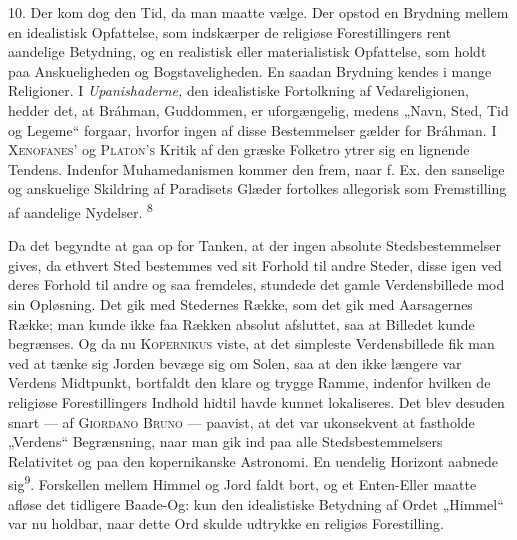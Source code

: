 \documentclass[12pt,a4paper,openany]{book}
\newcommand{\opage}[1]{\marginnote{\footnotesize\textit{[#1]}}}
\begin{document}
10. Der kom dog den Tid, da man maatte vælge. Der opstod en Brydning
mellem en idealistisk Opfattelse, som indskærper de religiøse
Forestillingers rent aandelige Betydning, og en realistisk eller
materialistisk Opfattelse, som holdt paa Anskueligheden og
Bogstaveligheden. En saadan Brydning kendes i mange Religioner. I
\textit{Upanishaderne,} den idealistiske Fortolkning af Vedareligionen,
hedder det, at Bráhman, Guddommen, er uforgængelig, medens „Navn, Sted,
Tid og Legeme“ forgaar, hvorfor ingen af disse Bestemmelser gælder for
Bráhman. I \textsc{Xenofanes’} og \textsc{Platon’s} Kritik af den græske
Folketro ytrer sig en lignende Tendens. Indenfor Muhamedanismen kommer
den frem, naar f. Ex. den sanselige og anskuelige Skildring af
Paradisets Glæder fortolkes allegorisk som Fremstilling af aandelige
Nydelser. \textsuperscript{8}

Da det begyndte at gaa op for Tanken, at der ingen absolute
Stedsbestemmelser gives, da ethvert Sted bestemmes ved sit Forhold til
andre Steder, disse igen ved deres Forhold til andre og saa fremdeles,
stundede det gamle Verdensbillede mod sin Opløsning. Det gik med
Stedernes Række, som det gik med Aarsagernes Række; man kunde ikke faa
Rækken absolut afsluttet, saa at Billedet kunde begrænses. Og da nu
\textsc{Kopernikus} viste, at det simpleste Verdensbillede fik man ved
at tænke sig Jorden bevæge sig om Solen, saa at den ikke længere var
Verdens Midtpunkt, bortfaldt den klare og trygge Ramme, indenfor hvilken
de religiøse Forestillingers Indhold hidtil havde kunnet lokaliseres.
Det blev desuden snart --- af \textsc{Giordano Bruno} --- paavist, at
det var ukonsekvent at fastholde „Verdens“ Begrænsning, naar man gik ind
paa alle Stedsbestemmelsers Relativitet og paa den kopernikanske
Astronomi. En uendelig Horizont aabnede sig\textsuperscript{9}.
Forskellen mellem
\opage{29}Himmel og Jord faldt bort, og et Enten-Eller maatte afløse det
tidligere Baade-Og: kun den idealistiske Betydning af Ordet „Himmel“ var
nu holdbar, naar dette Ord skulde udtrykke en religiøs Forestilling.
\end{document}
